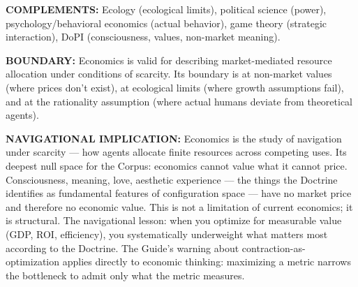 \textbf{COMPLEMENTS:} Ecology (ecological limits), political science (power), psychology/\allowbreak behavioral economics (actual behavior), game theory (strategic interaction), DoPI (consciousness, values, non-market meaning).


\textbf{BOUNDARY:} Economics is valid for describing market-mediated resource allocation under conditions of scarcity. Its boundary is at non-market values (where prices don't exist), at ecological limits (where growth assumptions fail), and at the rationality assumption (where actual humans deviate from theoretical agents).


\textbf{NAVIGATIONAL IMPLICATION:} Economics is the study of navigation under scarcity — how agents allocate finite resources across competing uses. Its deepest null space for the Corpus: economics cannot value what it cannot price. Consciousness, meaning, love, aesthetic experience — the things the Doctrine identifies as fundamental features of configuration space — have no market price and therefore no economic value. This is not a limitation of current economics; it is structural. The navigational lesson: when you optimize for measurable value (GDP, ROI, efficiency), you systematically underweight what matters most according to the Doctrine. The Guide's warning about contraction-as-optimization applies directly to economic thinking: maximizing a metric narrows the bottleneck to admit only what the metric measures.


\bigskip\noindent\makebox[\textwidth]{\color{rulegray}\rule{5cm}{0.3pt}}\bigskip
